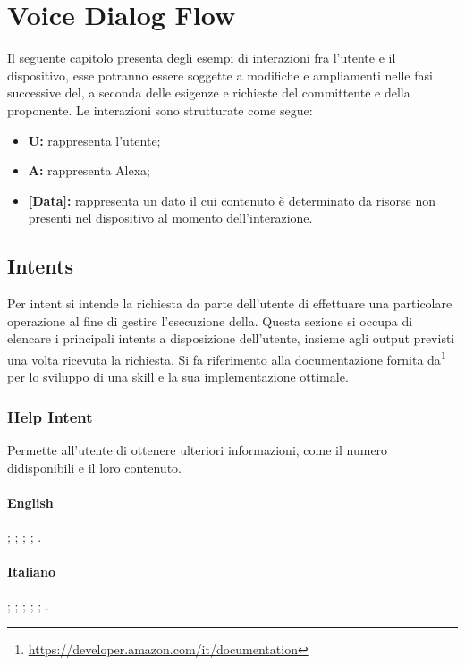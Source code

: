 \chapter{Voice Dialog Flow}

Il seguente capitolo presenta degli esempi di interazioni fra l'utente e il dispositivo, esse potranno essere soggette a modifiche e ampliamenti nelle fasi successive del, a seconda delle esigenze e richieste del committente e della proponente.
Le interazioni sono strutturate come segue:
\begin{itemize}
	\item \textbf{U:} rappresenta l'utente;
	\item \textbf{A:} rappresenta Alexa;
	\item \textbf{[Data]:} rappresenta un dato il cui contenuto è determinato da risorse non presenti nel dispositivo al momento dell'interazione.
\end{itemize}


\section{Intents}
Per intent si intende la richiesta da parte dell'utente di effettuare una particolare operazione al fine di gestire l'esecuzione della. 
Questa sezione si occupa di elencare i principali intents a disposizione dell'utente, insieme agli output previsti una volta ricevuta la richiesta.
Si fa riferimento alla documentazione fornita da\footnote{\url{https://developer.amazon.com/it/documentation}} per lo sviluppo di una skill e la sua implementazione ottimale.

\subsection{Help Intent}\label{help}
Permette all'utente di ottenere ulteriori informazioni, come il numero didisponibili e il loro contenuto.
\subsubsection{English}
\begin{itemize}
	;
	;
	;
	;
	.	
\end{itemize}
\subsubsection{Italiano}
\begin{itemize}
	;
	;
	;
	;
	;
	.
\end{itemize}

